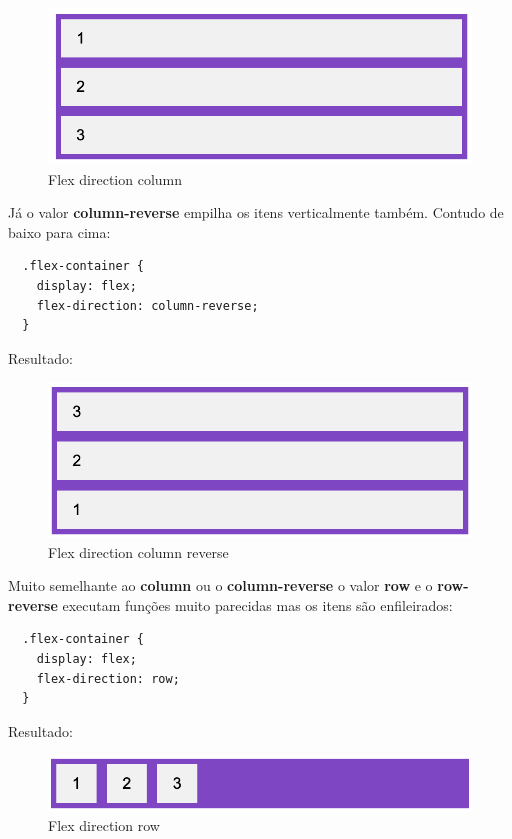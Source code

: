 \begin{figure}[H]
  \centering
  \includegraphics[scale=0.4]{imagens/flex-direction-column.png}
  \caption{Flex direction column}
  \label{fig:flex-direction-column}
\end{figure}

Já o valor \textbf{column-reverse} empilha os itens verticalmente também. Contudo de baixo para cima:

\begin{lstlisting}
  .flex-container {
    display: flex;
    flex-direction: column-reverse;
  } 
\end{lstlisting}

Resultado: 

\begin{figure}[H]
  \centering
  \includegraphics[scale=0.4]{imagens/flex-direction-column-reverse.png}
  \caption{Flex direction column reverse}
  \label{fig:model-flexbox}
\end{figure}

Muito semelhante ao \textbf{column} ou o \textbf{column-reverse} o valor \textbf{row} e o \textbf{row-reverse} executam funções muito parecidas mas os itens são enfileirados:

\begin{lstlisting}
  .flex-container {
    display: flex;
    flex-direction: row;
  } 
\end{lstlisting}

Resultado: 

\begin{figure}[H]
  \centering
  \includegraphics[scale=0.4]{imagens/flex-direction-row.png}
  \caption{Flex direction row}
  \label{fig:model-flexbox}
\end{figure}


